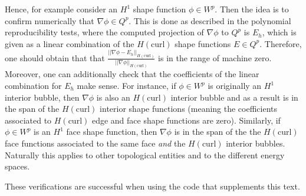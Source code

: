 Hence, for example consider an $H^1$ shape function $\phi\in W^p$.
Then the idea is to confirm numerically that $\nabla\phi\in Q^p$.
This is done as described in the polynomial reproducibility tests, where the computed projection of $\nabla\phi$ to $Q^p$ is $E_h$, which is given as a linear combination of the $H(\mathrm{curl})$ shape functions $E\in Q^p$.
Therefore, one should obtain that that $\frac{||\nabla\phi-E_h||_{H(\mathrm{curl})}}{||\nabla\phi||_{H(\mathrm{curl})}}$ is in the range of machine zero.
Moreover, one can additionally check that the coefficients of the linear combination for $E_h$ make sense.
For instance, if $\phi\in W^p$ is originally an $H^1$ interior bubble, then $\nabla\phi$ is also an $H(\mathrm{curl})$ interior bubble and as a result is in the span of the $H(\mathrm{curl})$ interior shape functions (meaning the coefficients associated to $H(\mathrm{curl})$ edge and face shape functions are zero).
Similarly, if $\phi\in W^p$ is an $H^1$ face shape function, then $\nabla\phi$ is in the span of the the $H(\mathrm{curl})$ face functions associated to the same face \textit{and} the $H(\mathrm{curl})$ interior bubbles.
Naturally this applies to other topological entities and to the different energy spaces.

These verifications are successful when using the code that supplements this text.



